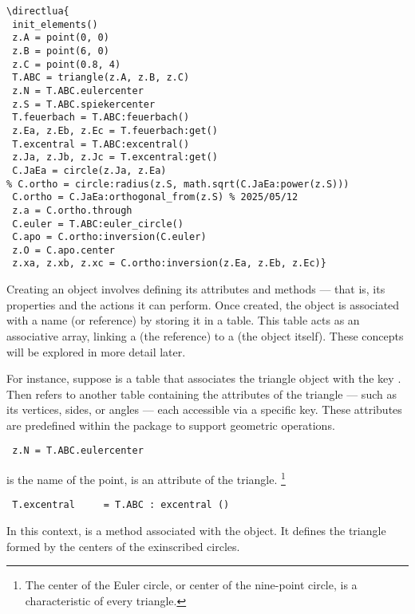 \begin{mybox}
\begin{verbatim}
\directlua{
 init_elements()
 z.A = point(0, 0)
 z.B = point(6, 0)
 z.C = point(0.8, 4)
 T.ABC = triangle(z.A, z.B, z.C)
 z.N = T.ABC.eulercenter
 z.S = T.ABC.spiekercenter
 T.feuerbach = T.ABC:feuerbach()
 z.Ea, z.Eb, z.Ec = T.feuerbach:get()
 T.excentral = T.ABC:excentral()
 z.Ja, z.Jb, z.Jc = T.excentral:get()
 C.JaEa = circle(z.Ja, z.Ea)
% C.ortho = circle:radius(z.S, math.sqrt(C.JaEa:power(z.S)))
 C.ortho = C.JaEa:orthogonal_from(z.S) % 2025/05/12
 z.a = C.ortho.through
 C.euler = T.ABC:euler_circle()
 C.apo = C.ortho:inversion(C.euler)
 z.O = C.apo.center
 z.xa, z.xb, z.xc = C.ortho:inversion(z.Ea, z.Eb, z.Ec)}
\end{verbatim}
\end{mybox}

Creating an object involves defining its attributes and methods — that is, its properties and the actions it can perform. Once created, the object is associated with a name (or reference) by storing it in a table. This table acts as an associative array, linking a  (the reference) to a  (the object itself). These concepts will be explored in more detail later.

For instance, suppose  is a table that associates the triangle object with the key . Then  refers to another table containing the attributes of the triangle — such as its vertices, sides, or angles — each accessible via a specific key. These attributes are predefined within the package to support geometric operations.

\vspace{1em}
\begin{mybox}
\begin{verbatim}
 z.N = T.ABC.eulercenter 
\end{verbatim}
\end{mybox}

 is the name of the point,  is an attribute of the triangle.
\footnote{ The center of the Euler circle, or center of the nine-point circle, is a characteristic of every triangle.}

\begin{mybox}
\begin{verbatim}
 T.excentral     = T.ABC : excentral () 
\end{verbatim}
\end{mybox}

In this context,  is a method associated with the object. It defines the triangle formed by the centers of the exinscribed circles. 



